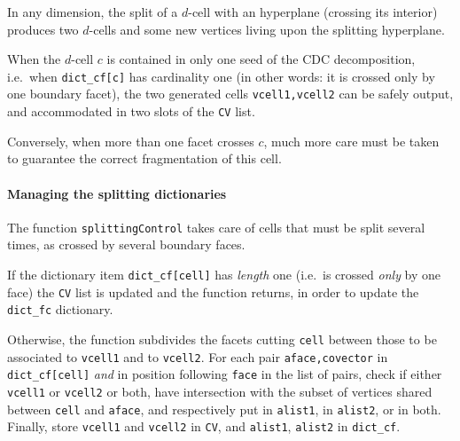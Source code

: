 \documentclass[11pt,oneside]{article}	%
\begin{document}
In any dimension, the split of a $d$-cell with an hyperplane (crossing its interior) produces two $d$-cells and some new vertices living upon the splitting hyperplane.

When the $d$-cell $c$ is contained in only one seed of the CDC decomposition, i.e.~when \texttt{dict\_cf[c]} has cardinality one (in other words: it is crossed only by one boundary facet), the two generated cells \texttt{vcell1,vcell2} can be safely output, and accommodated in two slots of the \texttt{CV} list.

Conversely, when more than one facet crosses $c$, much more care must be taken to guarantee the correct fragmentation of this cell.


\paragraph{Managing the splitting dictionaries}
The function \texttt{splittingControl} takes care of cells that must be split several times, as crossed by several boundary faces. 

If the dictionary item \texttt{dict\_cf[cell]} has \emph{length} one (i.e.~is crossed  \emph{only} by one face) the \texttt{CV} list is updated and the function returns, in order to update the \texttt{dict\_fc} dictionary.

Otherwise, the function subdivides the facets cutting \texttt{cell} between those to be associated to \texttt{vcell1} and to \texttt{vcell2}. 
For each pair \texttt{aface,covector} in \texttt{dict\_cf[cell]} \emph{and} in position following \texttt{face} in the list of pairs, check if either \texttt{vcell1} or \texttt{vcell2} or both, have intersection with the subset of vertices shared between \texttt{cell} and \texttt{aface}, and respectively put in \texttt{alist1}, in \texttt{alist2}, or in both.
Finally, store \texttt{vcell1} and \texttt{vcell2} in \texttt{CV}, and \texttt{alist1}, \texttt{alist2} in \texttt{dict\_cf}.
\end{document}

